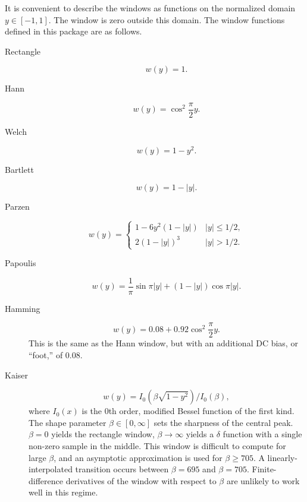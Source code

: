 It is convenient to describe the windows as functions on the normalized
domain $y \in [-1, 1]$.  The window is zero outside this domain.  The
window functions defined in this package are as follows.
\begin{description}
\item[Rectangle]
\begin{equation}
w(y)
   = 1.
\end{equation}

\item[Hann]
\begin{equation}
w(y)
   = \cos^2 \frac{\pi}{2} y.
\end{equation}

\item[Welch]
\begin{equation}
w(y)
   = 1 - y^2.
\end{equation}

\item[Bartlett]
\begin{equation}
w(y)
   = 1 - |y|.
\end{equation}

\item[Parzen]
\begin{equation}
w(y)
   = \left\{ \begin{array}{ll}
   1 - 6 y^2 (1 - |y|) & |y| \leq 1 / 2, \\
   2 (1 - |y|)^3 & |y| > 1 / 2.
   \end{array}\right.
\end{equation}

\item[Papoulis]
\begin{equation}
w(y)
   = \frac{1}{\pi} \sin \pi |y| + (1 - |y|) \cos \pi |y|.
\end{equation}

\item[Hamming]
\begin{equation}
w(y)
   = 0.08 + 0.92 \cos^{2} \frac{\pi}{2} y.
\end{equation}
This is the same as the Hann window, but with an additional DC bias, or
``foot,'' of 0.08.

\item[Kaiser]
\begin{equation}
w(y)
   = I_0 \left( \beta \sqrt{1-y^2} \right) / I_0(\beta),
\end{equation}
where $I_0(x)$ is the $0$th order, modified Bessel function of the first
kind.  The shape parameter $\beta \in [0, \infty]$ sets the sharpness of
the central peak.  $\beta = 0$ yields the rectangle window, $\beta
\rightarrow \infty$ yields a $\delta$ function with a single non-zero
sample in the middle.  This window is difficult to compute for large
$\beta$, and an asymptotic approximation is used for $\beta \ge 705$.  A
linearly-interpolated transition occurs between $\beta = 695$ and $\beta =
705$.  Finite-difference derivatives of the window with respect to $\beta$
are unlikely to work well in this regime.


\end{description}

